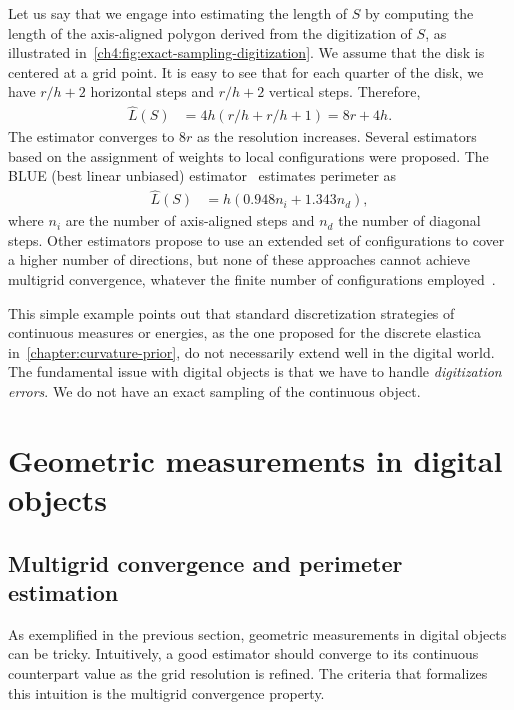 Let us say that we engage into estimating the length of $S$ by computing the length of the axis-aligned polygon derived from the digitization of $S$, as illustrated in~\cref{ch4:fig:exact-sampling-digitization}. We assume that the disk is centered at a grid point. It is easy to see that for each quarter of the disk, we have $r/h + 2$ horizontal steps and $r/h + 2$ vertical steps. Therefore,
\begin{align*}
	\hat{L}(S) &= 4h(r/h + r/h + 1) = 8r + 4h.
\end{align*}
%
The estimator converges to $8r$ as the resolution increases. %
Several estimators based on the assignment of weights to local configurations were proposed. The BLUE (best linear unbiased) estimator~\cite{dorst87length} estimates perimeter as 
\begin{align*}
	\hat{L}(S) &= h( 0.948 n_i + 1.343 n_d),
\end{align*}
where $n_i$ are the number of axis-aligned steps and $n_d$ the number of diagonal steps. Other estimators propose to use an extended set of configurations to cover a higher number of directions, but none of these approaches cannot achieve multigrid convergence, whatever the finite number of configurations employed~\cite{tajine03local}.

This simple example points out that standard discretization strategies of continuous measures or energies, as the one proposed for the discrete elastica in~\cref{chapter:curvature-prior}, do not necessarily extend well in the digital world. The fundamental issue with digital objects is that we have to handle \emph{digitization errors}. We do not have an exact sampling of the continuous object.

\section{Geometric measurements in digital objects}\label{ch4:sec:geometric-measurements}

\subsection{Multigrid convergence and perimeter estimation}

As exemplified in the previous section, geometric measurements in digital objects can be tricky. Intuitively, a good estimator should converge to its continuous counterpart value as the grid resolution is refined. The criteria that formalizes this intuition is the multigrid convergence property.

